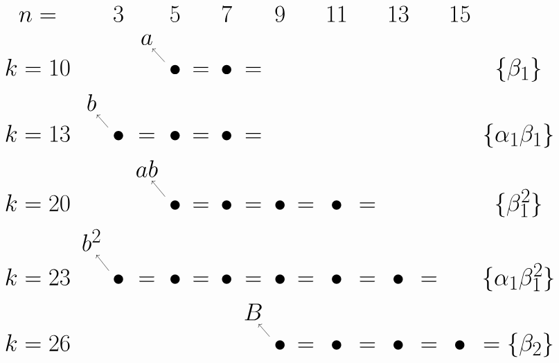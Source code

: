 \documentclass{article}
\begin{document}
\(
\begin{tikzcd}[nodes={font=\Huge},row sep=0.2cm,column sep=0.1cm]
n= & & 3 & & 5 & & 7 & & 9 & & 11 & & 13 &  & 15\\
 & & & a & & \\
k=10 & {} & {} & {} & \bullet \arrow[lu] & = & \bullet & = & {} & {} & {} & {} & {} & {} & {} &  \{\beta_1\} \\
& b & {} & {} & {} & {} \\
k=13 & {} & \bullet \arrow[lu] & = & \bullet & = & \bullet & = & {} & {} & {} & {} & {} & {} & {} & {} \{\alpha_1\beta_1\} \\
& {}  & {}  & ab  & {} & {} \\ 
k=20 & {} & {} & {} & \bullet \arrow[lu] & = & \bullet & = & \bullet & = & \bullet & = & {} & {} & {} & \{\beta_1^2\} \\
& b^2  & {}  & {}  & {} & {} \\ 
k=23 & {} & \bullet \arrow[lu] & = & \bullet & = & \bullet & = & \bullet & = & \bullet & = & \bullet & = & {} & {} \{\alpha_1\beta_1^2\} \\
& {}  & {} & {} & {} & {} & {} & B & {} & {} \\ 
k=26 & {} & {} & {} & {} & {} & {} & {} & \bullet \arrow[lu] & = & \bullet & = & \bullet & = & \bullet & = \{\beta_2\} \\
\end{tikzcd}
\)
\end{document}
